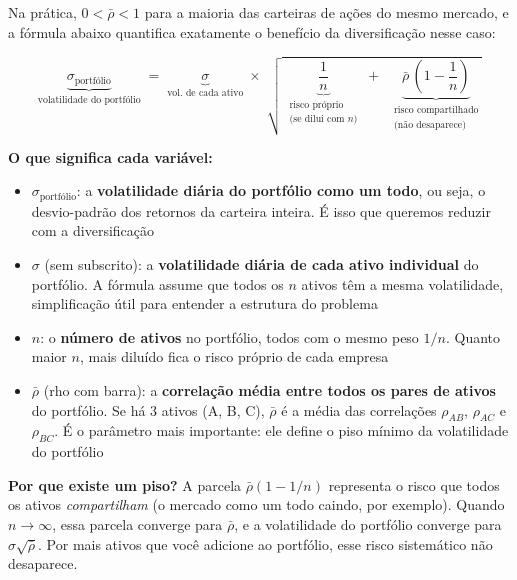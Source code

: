\documentclass[11pt,a4paper]{article}
\theoremstyle{quant}
\begin{document}
Na prática, $0 < \bar\rho < 1$ para a maioria das carteiras de ações do mesmo mercado,
e a fórmula abaixo quantifica exatamente o benefício da diversificação nesse caso:

\begin{equation}
  \underbrace{\sigma_{\text{portfólio}}}_{\text{volatilidade do portfólio}}
  \;=\;
  \underbrace{\sigma}_{\text{vol. de cada ativo}}
  \;\times\;
  \sqrt{\;\underbrace{\frac{1}{n}}_{\substack{\text{risco próprio}\\\text{(se dilui com }n\text{)}}}
  \;+\;\;
  \underbrace{\bar\rho\,\left(1 - \frac{1}{n}\right)}_{\substack{\text{risco compartilhado}\\\text{(não desaparece)}}}}
  \label{eq:divport}
\end{equation}

\textbf{O que significa cada variável:}

\begin{itemize}
  \item $\sigma_{\text{portfólio}}$: a \textbf{volatilidade diária do portfólio como um todo},
        ou seja, o desvio-padrão dos retornos da carteira inteira. É isso que queremos
        reduzir com a diversificação

  \item $\sigma$ (sem subscrito): a \textbf{volatilidade diária de cada ativo individual}
        do portfólio. A fórmula assume que todos os $n$ ativos têm a mesma volatilidade,
        simplificação útil para entender a estrutura do problema

  \item $n$: o \textbf{número de ativos} no portfólio, todos com o mesmo peso $1/n$.
        Quanto maior $n$, mais diluído fica o risco próprio de cada empresa

  \item $\bar\rho$ (rho com barra): a \textbf{correlação média entre todos os pares de ativos}
        do portfólio. Se há 3 ativos (A, B, C), $\bar\rho$ é a média das correlações
        $\rho_{AB}$, $\rho_{AC}$ e $\rho_{BC}$. É o parâmetro mais importante:
        ele define o piso mínimo da volatilidade do portfólio
\end{itemize}

\textbf{Por que existe um piso?} A parcela $\bar\rho(1 - 1/n)$ representa o risco que
todos os ativos \emph{compartilham} (o mercado como um todo caindo, por exemplo).
Quando $n \to \infty$, essa parcela converge para $\bar\rho$, e a volatilidade do
portfólio converge para $\sigma\sqrt{\bar\rho}$. Por mais ativos que você adicione
ao portfólio, esse risco sistemático não desaparece.
\end{document}
